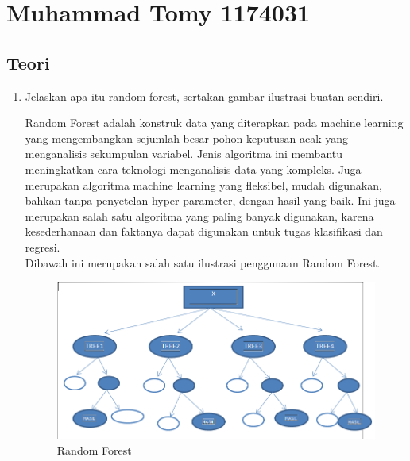 \section{Muhammad Tomy 1174031}

\subsection{Teori}
\begin{enumerate}
\item Jelaskan apa itu random forest, sertakan gambar ilustrasi buatan sendiri.\par
Random Forest adalah konstruk data yang diterapkan pada machine learning yang mengembangkan sejumlah besar pohon keputusan acak yang menganalisis sekumpulan variabel. Jenis algoritma ini membantu meningkatkan cara teknologi menganalisis data yang kompleks. Juga merupakan algoritma machine learning yang fleksibel, mudah digunakan, bahkan tanpa penyetelan hyper-parameter, dengan hasil yang baik. Ini juga merupakan salah satu algoritma yang paling banyak digunakan, karena kesederhanaan dan faktanya dapat digunakan untuk tugas klasifikasi dan regresi.\\
Dibawah ini merupakan salah satu ilustrasi penggunaan Random Forest.
\begin{figure}[ht]
\centering
\includegraphics[scale=0.5]{figures/1174031/3/teori1.PNG}
\caption{Random Forest}
\label{contoh}
\end{figure}


\end{enumerate}
